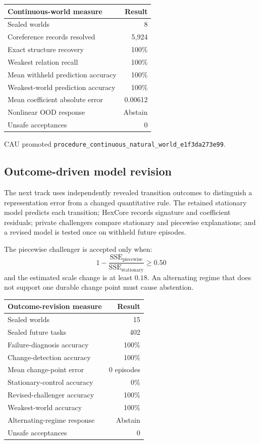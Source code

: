 \begin{center}
\begin{tabular}{lr}
\hline
Continuous-world measure & Result \\
\hline
Sealed worlds & 8 \\
Coreference records resolved & 5,924 \\
Exact structure recovery & 100\% \\
Weakest relation recall & 100\% \\
Mean withheld prediction accuracy & 100\% \\
Weakest-world prediction accuracy & 100\% \\
Mean coefficient absolute error & 0.00612 \\
Nonlinear OOD response & Abstain \\
Unsafe acceptances & 0 \\
\hline
\end{tabular}
\end{center}

CAU promoted
\texttt{procedure\_continuous\_natural\_world\_e1f3da273e99}.

\subsection{Outcome-driven model revision}

The next track uses independently revealed transition outcomes to distinguish a
representation error from a changed quantitative rule.  The retained stationary
model predicts each transition; HexCore records signature and coefficient
residuals; private challengers compare stationary and piecewise explanations;
and a revised model is tested once on withheld future episodes.

The piecewise challenger is accepted only when:
\[
  1 -
  \frac{\mathrm{SSE}_{\mathrm{piecewise}}}
       {\mathrm{SSE}_{\mathrm{stationary}}}
  \geq 0.50
\]
and the estimated scale change is at least $0.18$.  An alternating regime that
does not support one durable change point must cause abstention.

\begin{center}
\begin{tabular}{lr}
\hline
Outcome-revision measure & Result \\
\hline
Sealed worlds & 15 \\
Sealed future tasks & 402 \\
Failure-diagnosis accuracy & 100\% \\
Change-detection accuracy & 100\% \\
Mean change-point error & 0 episodes \\
Stationary-control accuracy & 0\% \\
Revised-challenger accuracy & 100\% \\
Weakest-world accuracy & 100\% \\
Alternating-regime response & Abstain \\
Unsafe acceptances & 0 \\
\hline
\end{tabular}
\end{center}

